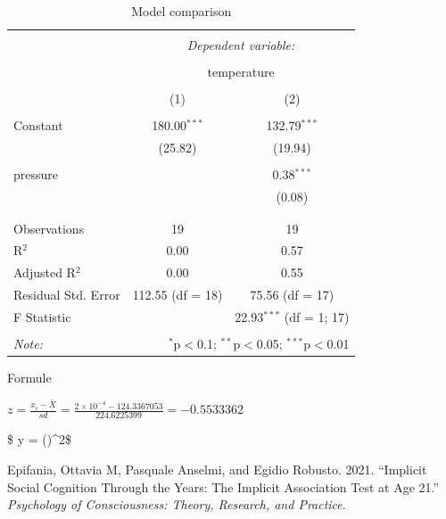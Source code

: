 \documentclass[
]{article}
\newenvironment{Shaded}{\begin{snugshade}}{\end{snugshade}}
\newcommand{\NormalTok}[1]{#1}
\newcommand{\OtherTok}[1]{\textcolor[rgb]{0.56,0.35,0.01}{#1}}
\newcommand{\SpecialCharTok}[1]{\textcolor[rgb]{0.00,0.00,0.00}{#1}}
\newlength{\cslhangindent}
\newlength{\cslentryspacingunit} %
\newenvironment{CSLReferences}[2] %
 {%
  \setlength{\parindent}{0pt}
  \ifodd #1
  \let\oldpar\par
  \def\par{\hangindent=\cslhangindent\oldpar}
  \fi
  \setlength{\parskip}{#2\cslentryspacingunit}
 }%
 {}
\begin{document}
\begin{table}[!htbp] \centering 
\begin{tabular}{@{\extracolsep{5pt}}lcc} 
\\[-1.8ex]\hline 
\hline \\[-1.8ex] 
 & \multicolumn{2}{c}{\textit{Dependent variable:}} \\ 
\cline{2-3} 
\\[-1.8ex] & \multicolumn{2}{c}{temperature} \\ 
\\[-1.8ex] & (1) & (2)\\ 
\hline \\[-1.8ex] 
 Constant & 180.00$^{***}$ & 132.79$^{***}$ \\ 
  & (25.82) & (19.94) \\ 
  & & \\ 
 pressure &  & 0.38$^{***}$ \\ 
  &  & (0.08) \\ 
  & & \\ 
\hline \\[-1.8ex] 
Observations & 19 & 19 \\ 
R$^{2}$ & 0.00 & 0.57 \\ 
Adjusted R$^{2}$ & 0.00 & 0.55 \\ 
Residual Std. Error & 112.55 (df = 18) & 75.56 (df = 17) \\ 
F Statistic &  & 22.93$^{***}$ (df = 1; 17) \\ 
\hline 
\hline \\[-1.8ex] 
\textit{Note:}  & \multicolumn{2}{r}{$^{*}$p$<$0.1; $^{**}$p$<$0.05; $^{***}$p$<$0.01} \\ 
\end{tabular} 
  \caption{Model comparison} 
  \label{} 
\end{table}

Formule

\(z = \frac{x_i - \bar{X}}{sd} = \frac{\ensuremath{2\times 10^{-4}}- 124.3367053}{224.6225399 } = -0.5533362\)

\begin{Shaded}
\end{Shaded}

\$ y = \left()\right \^{}2\$

\hypertarget{refs}{}
\begin{CSLReferences}{1}{0}
\leavevmode{}%
Epifania, Ottavia M, Pasquale Anselmi, and Egidio Robusto. 2021.
{``Implicit Social Cognition Through the Years: The Implicit Association
Test at Age 21.''} \emph{Psychology of Consciousness: Theory, Research,
and Practice}.

\end{CSLReferences}
\end{document}
